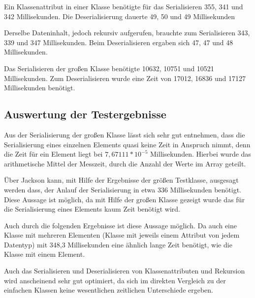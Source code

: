 Ein Klassenattribut in einer Klasse ben\"otigte f\"ur das Serialisieren 355, 341 und 342 Millisekunden. Die Deserialisierung dauerte 49, 50 und 49 Millisekunden

Derselbe Dateninhalt, jedoch rekursiv aufgerufen, brauchte zum Serialisieren 343, 339 und 347 Millisekunden. Beim Deserialisieren ergaben sich 47, 47 und 48 Millisekunden.

Das Serialisieren der gro\ss{}en Klasse ben\"otigte 10632, 10751 und 10521 Millisekunden. Zum Deserialisieren wurde eine Zeit von 17012, 16836 und 17127 Millisekunden ben\"otigt.

\subsection{Auswertung der Testergebnisse}
Aus der Serialisierung der gro\ss{}en Klasse l\"asst sich sehr gut entnehmen, dass die Serialisierung eines einzelnen Elements quasi keine Zeit in Anspruch nimmt, denn die Zeit f\"ur ein Element liegt bei $7,67111*10^{-5}$ Millisekunden. Hierbei wurde das arithmetische Mittel der Messzeit, durch die Anzahl der Werte im Array geteilt.

\"Uber Jackson kann, mit Hilfe der Ergebnisse der gr\"o\ss{}en Testklasse, ausgesagt werden dass, der Anlauf der Serialisierung in etwa 336 Millisekunden ben\"otigt. Diese Aussage ist m\"oglich, da mit Hilfe der gro\ss{}en Klasse gezeigt wurde das f\"ur die Serialisierung eines Elements kaum Zeit ben\"otigt wird.


Auch durch die folgenden Ergebnisse ist diese Aussage  m\"oglich. Da auch eine Klasse mit mehreren Elementen (Klasse mit jeweils einem Attribut von jedem Datentyp) mit 348,3 Millisekunden eine \"ahnlich lange Zeit ben\"otigt, wie die Klasse mit einem Element.

Auch das Serialisieren und Deserialisieren von Klassenattributen und Rekursion wird anscheinend sehr gut optimiert, da sich im direkten Vergleich zu der einfachen Klassen keine wesentlichen zeitlichen Unterschiede ergeben.

